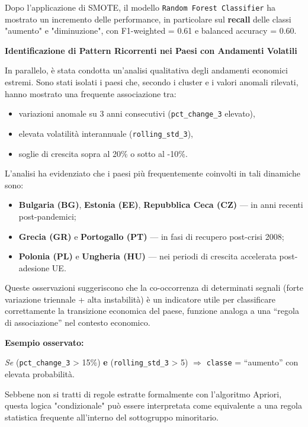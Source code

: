 \documentclass[conference]{IEEEtran}
\begin{document}
\begin{itemize}
Dopo l’applicazione di SMOTE, il modello \texttt{Random Forest Classifier} ha mostrato un incremento delle performance, in particolare sul \textbf{recall} delle classi "aumento" e "diminuzione", con F1-weighted = 0.61 e balanced accuracy = 0.60.

\noindent\textbf{Identificazione di Pattern Ricorrenti nei Paesi con Andamenti Volatili}

In parallelo, è stata condotta un’analisi qualitativa degli andamenti economici estremi. Sono stati isolati i paesi che, secondo i cluster e i valori anomali rilevati, hanno mostrato una frequente associazione tra:

\begin{itemize} \item variazioni anomale su 3 anni consecutivi (\texttt{pct\_change\_3} elevato), \item elevata volatilità interannuale (\texttt{rolling\_std\_3}), \item soglie di crescita sopra al 20\% o sotto al -10\%. \end{itemize}

L’analisi ha evidenziato che i paesi più frequentemente coinvolti in tali dinamiche sono:

\begin{itemize} \item \textbf{Bulgaria (BG)}, \textbf{Estonia (EE)}, \textbf{Repubblica Ceca (CZ)} — in anni recenti post-pandemici; \item \textbf{Grecia (GR)} e \textbf{Portogallo (PT)} — in fasi di recupero post-crisi 2008; \item \textbf{Polonia (PL)} e \textbf{Ungheria (HU)} — nei periodi di crescita accelerata post-adesione UE. \end{itemize}

Queste osservazioni suggeriscono che la co-occorrenza di determinati segnali (forte variazione triennale + alta instabilità) è un indicatore utile per classificare correttamente la transizione economica del paese, funzione analoga a una “regola di associazione” nel contesto economico.

\noindent\textbf{Esempio osservato:}

\begin{center} \textit{Se} (\texttt{pct\_change\_3} > 15\%) \textbf{e} (\texttt{rolling\_std\_3} > 5) $\Rightarrow$ \texttt{classe} = “aumento” con elevata probabilità. \end{center}

Sebbene non si tratti di regole estratte formalmente con l’algoritmo Apriori, questa logica "condizionale" può essere interpretata come equivalente a una regola statistica frequente all’interno del sottogruppo minoritario.



\end{itemize}
\end{document}
